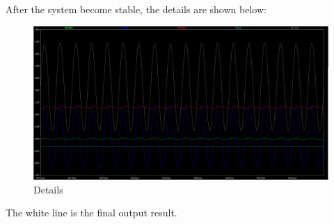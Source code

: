 After the system become stable, the details are shown below:
\begin{figure}[H]
\centering
\includegraphics[width=1\textwidth]{./2023Mar/WaveAllLocal.png}
\caption{Details}
\label{WaveAllLocal}
\end{figure}

The white line is the final output result.
